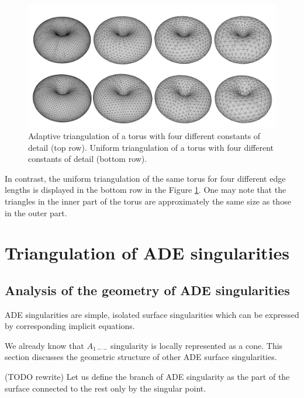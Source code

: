 \begin{figure}[h!]
    \centerline{\includegraphics[scale=0.5]{images/img58}}
    \caption[Adaptive triangulation of a torus]
    {Adaptive triangulation of a torus with four different constants of detail (top row).
    Uniform triangulation of a torus with four different constants of detail (bottom row).}
    \label{img:58}
\end{figure}

In contrast, the uniform triangulation of the same torus for four different edge lengths
is displayed in the bottom row in the Figure \ref{img:58}. One may note that the 
triangles in the inner part of the torus are approximately the same 
size as those in the outer part.

\section{Triangulation of ADE singularities}
\label{sub3.2}

\subsection{Analysis of the geometry of ADE singularities}

ADE singularities are simple, isolated surface singularities which can be
expressed by corresponding implicit equations.

We already know that $A_{1--}$ singularity is locally represented as a cone.
This section discusses the geometric structure of other ADE surface singularities.

\begin{definition} (TODO rewrite)
    Let us define the branch of ADE singularity as the part of the surface
    connected to the rest only by the singular point.
\end{definition}

